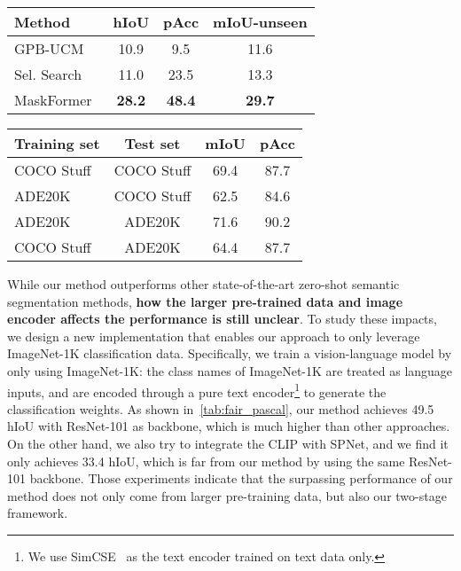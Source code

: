 \documentclass[runningheads]{llncs}
\makeatletter
\newcommand\tabcaption{\def\@captype{table}\caption}
\makeatother
\begin{document}
\begin{figtab}
\footnotesize
  \begin{minipage}[t]{0.48\linewidth}
    \centering
    \tabcaption{Study of different proposal generation methods on COCO Stuff dataset.}
    \vspace{1em}
    \begin{tabular}{l|c|c|c}
    \toprule
      Method & hIoU & pAcc & mIoU-unseen\\
      \hline
      GPB-UCM~\cite{arbelaez2010contour}&10.9  &	9.5&	11.6  \\
      Sel. Search~\cite{uijlings2013selective}&11.0 &23.5&13.3\\
      MaskFormer~\cite{cheng2021per}&\textbf{28.2} &\textbf{48.4}&\textbf{29.7}\\
    \bottomrule
    \end{tabular}
    \label{tab:proposal_methods}
  \end{minipage}\quad
  \begin{minipage}[t]{0.48\linewidth}
    \centering
    \tabcaption{Evaluate the generalization ability of mask proposal generator.}
    \vspace{1em}
    \begin{tabular}{l|c|c|c}
    \toprule
      Training set& Test set & mIoU&pAcc \\
      \hline
      COCO Stuff&COCO Stuff &69.4&87.7\\
      ADE20K&COCO Stuff& 62.5&84.6\\
      \hline
      ADE20K&ADE20K	 &71.6&90.2\\
      COCO Stuff&ADE20K	 &64.4&87.7\\
    \bottomrule
    \end{tabular}
    \label{tab:proposal_gen}
    
  \end{minipage}
\end{figtab}

While our method outperforms other state-of-the-art zero-shot semantic segmentation methods, \textbf{how the larger pre-trained data and image encoder affects the performance is still unclear}. To study these impacts, we design a new implementation that enables our approach to only leverage ImageNet-1K classification data. Specifically, we train a vision-language model by only using ImageNet-1K: the class names of ImageNet-1K are treated as language inputs, and are encoded through a pure text encoder\footnote{We use SimCSE~\cite{gao2021simcse} as the text encoder trained on text data only.} to generate the classification weights. As shown in~\cref{tab:fair_pascal}, our method achieves 49.5 hIoU with ResNet-101 as backbone, which is much higher than other approaches. On the other hand, we also try to integrate the CLIP with SPNet, and we find it only achieves 33.4 hIoU, which is far from our method by using the same ResNet-101 backbone. Those experiments indicate that the surpassing performance of our method does not only come from larger pre-training data, but also our two-stage framework.
\end{document}
